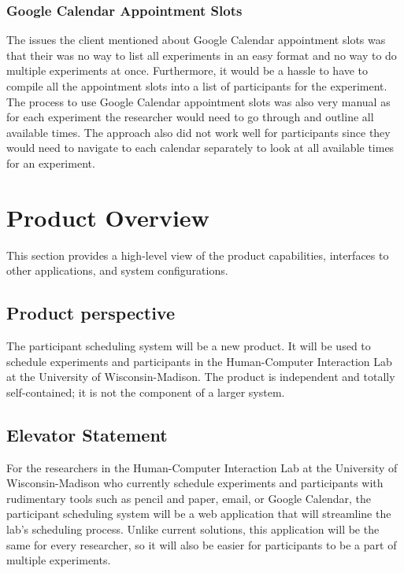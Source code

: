 \documentclass{article}
\begin{document}
\subsubsection{Google Calendar Appointment Slots}
The issues the client mentioned about Google Calendar appointment slots was that their was no way to list all experiments in an easy format and no way to do multiple experiments at once. Furthermore, it would be a hassle to have to compile all the appointment slots into a list of participants for the experiment. The process to use Google Calendar appointment slots was also very manual as for each experiment the researcher would need to go through and outline all available times. The approach also did not work well for participants since they would need to navigate to each calendar separately to look at all available times for an experiment.

\section{Product Overview}
This section provides a high-level view of the product capabilities, interfaces to other applications, and system configurations.

\subsection{Product perspective}
The participant scheduling system will be a new product. It will be used to schedule experiments and participants in the Human-Computer Interaction Lab at the University of Wisconsin-Madison. The product is independent and totally self-contained; it is not the component of a larger system.

\subsection{Elevator Statement}
For the researchers in the Human-Computer Interaction Lab at the University of Wisconsin-Madison who currently schedule experiments and participants with rudimentary tools such as pencil and paper, email, or Google Calendar, the participant scheduling system will be a web application that will streamline the lab's scheduling process. Unlike current solutions, this application will be the same for every researcher, so it will also be easier for participants to be a part of multiple experiments.
\end{document}
